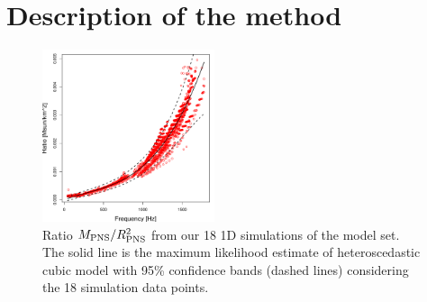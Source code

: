 \section{Description of the method}
\label{methods}

\begin{figure}[t]
 \centering
 \includegraphics[width=0.45\textwidth]{plots/model}
 \caption{Ratio $M_{\rm PNS}/R_{\rm PNS}^2$ from our 18 1D simulations of the model set. The solid line is the maximum likelihood estimate of heteroscedastic cubic model with 95\% confidence bands (dashed lines) considering the 18 simulation data points.} 
 \label{fig:LMVAR}
\end{figure}

